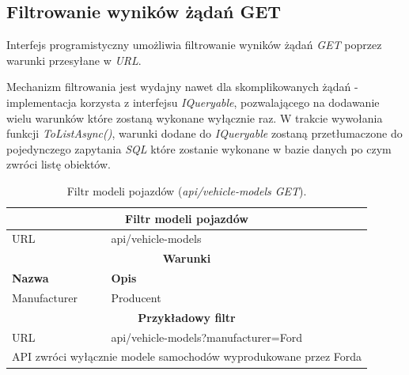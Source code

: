 \documentclass[eng,printmode,openany]{mgr}
\begin{document}
	
	\subsection{Filtrowanie wyników żądań GET}
	Interfejs programistyczny umożliwia filtrowanie wyników żądań \textit{GET} poprzez warunki przesyłane w \textit{URL}.
	
	Mechanizm filtrowania jest wydajny nawet dla skomplikowanych żądań - implementacja korzysta z interfejsu \textit{IQueryable}, pozwalającego na dodawanie wielu warunków które zostaną wykonane wyłącznie raz. W trakcie wywołania funkcji \textit{ToListAsync()}, warunki dodane do \textit{IQueryable} zostaną przetłumaczone do pojedynczego zapytania \textit{SQL} które zostanie wykonane w bazie danych po czym zwróci listę obiektów.
	
	
	
	\begin{table}[H]
		\caption{Filtr modeli pojazdów (\textit{api/vehicle-models GET}).}
		\begin{tabularx}{\textwidth}{|l|X|}
			\hline                                       							
			\multicolumn{2}{|c|}{\textbf{Filtr modeli pojazdów}}  							        \\ \hline
			URL                 & api/vehicle-models     							             	\\ \hline
			\multicolumn{2}{|c|}{\textbf{Warunki}}     												\\ \hline
			\textbf{Nazwa}      & \textbf{Opis}              										\\ \hline
			Manufacturer        & Producent         												\\ \hline
			\multicolumn{2}{|c|}{\textbf{Przykładowy filtr}}										\\ \hline
			URL                 & api/vehicle-models?manufacturer=Ford								\\ \hline
			\multicolumn{2}{|l|}{API zwróci wyłącznie modele samochodów wyprodukowane przez Forda}	\\ \hline
		\end{tabularx}
	\end{table}
	
\end{document}
